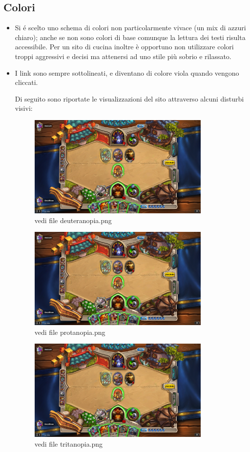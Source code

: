\documentclass[12pt]{article}
\begin{document}
			\subsection{Colori}
			\begin{itemize}
				\item Si \'e scelto uno schema di colori non particolarmente vivace (un mix di azzuri chiaro); anche se non sono colori di base comunque la lettura dei testi risulta accessibile. Per un sito di cucina inoltre è opportuno non utilizzare colori troppi aggressivi e decisi ma attenersi ad uno stile più sobrio e rilassato. 

				\item I link sono sempre sottolineati, e diventano di colore viola quando vengono cliccati.

			Di seguito sono riportate le visualizzazioni del sito attraverso alcuni disturbi visivi:

			\begin{figure}
			\centering
			\includegraphics[width=90mm]{deuteranopia}
			\caption{vedi file deuteranopia.png}
			\end{figure} 

			\begin{figure}
			\centering
			\includegraphics[width=90mm]{protanopia}
			\caption{vedi file protanopia.png}
			\end{figure}

			\begin{figure}
			\centering
			\includegraphics[width=90mm]{tritanopia}
			\caption{vedi file tritanopia.png}
			\end{figure}
			
			\end{itemize}	
\end{document}
